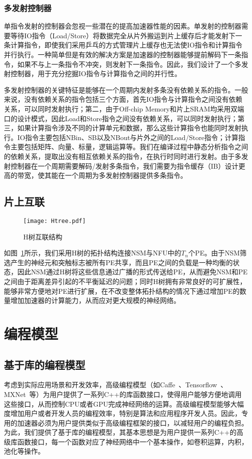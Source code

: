 \subsubsection{多发射控制器}
单指令发射的控制器会忽视一些潜在的提高加速器性能的因素。单发射的控制器需要等待IO指令（Load/Store）将数据完全从片外搬运到片上缓存后才能发射下一条计算指令，即使我们采用乒乓的方式管理片上缓存也无法使IO指令和计算指令并行执行。一种简单但是有效的解决方案是加速器的控制器能够提前解码下一条指令，如果不与上一条指令不冲突，则发射下一条指令。因此，我们设计了一个多发射控制器，用于充分挖掘IO指令与计算指令之间的并行性。

多发射控制器的关键特征是能够在一个周期内发射多条没有依赖关系的指令。一般来说，没有依赖关系的指令包括三个方面，首先IO指令与计算指令之间没有依赖关系，可以同时发射执行；第二，由于Off-chip Memory和片上SRAM均采用双端口的设计模式，因此Load和Store指令之间没有依赖关系，可以同时发射执行；第三，如果计算指令涉及不同的计算单元和数据，那么这些计算指令也能同时发射执行。IO指令主要包括NBin、SB以及NBout与片外之间的Load/Store指令；计算指令主要包括矩阵、向量、标量，逻辑运算等。我们在编译过程中静态分析指令之间的依赖关系，提取出没有相互依赖关系的指令，在执行时同时进行发射。由于多发射控制器在一个周期需要解码/发射多条指令，我们需要为指令缓存（IB）设计更高的带宽，使其能在一个周期为多发射控制器提供多条指令。

\subsection{片上互联}

\begin{figure}[h]
\centering
\texttt{[image: Htree.pdf]}
\caption{H树互联结构}
\label{fig:Htree}
\end{figure}

如图~\ref{fig:Htree}所示，我们采用H树的拓扑结构连接NSM与NFU中的$T_n$个PE。由于NSM筛选产生的神经元和突触标志被所有PE共享，而且PE之间的负载是一种均衡的状态，因此NSM通过H树将这些信息通过广播的形式传送给PE，从而避免NSM和PE之间由于距离差异引起的不平衡延迟的问题；同时H树拥有非常良好的可扩展性，能够非常方便地对PE进行扩展，在不改变整体拓扑结构的情况下通过增加PE的数量增加加速器的计算能力，从而应对更大规模的神经网络。


\section{编程模型}

\subsection{基于库的编程模型}
考虑到实际应用场景和开发效率，高级编程模型（如Caffe~\cite{jia2014caffe}、Tensorflow~\cite{abadi2016tensorflow}、MXNet~\cite{chen2015mxnet}等）为用户提供了一系列C++的库函数接口，使得用户能够方便地调用这些接口，从而控制CPU或者GPU完成神经网络的运算。高级编程模型能够大幅度增加用户或者开发人员的编程效率，特别是算法和应用程序开发人员。因此，专用的加速器必须为用户提供类似于高级编程框架的接口，以减轻用户的编程负担。为此，我们提供了基于库的编程模型，其基本思想是为用户提供一系列C++的高级库函数接口，每一个函数对应了神经网络中一个基本操作，如卷积运算，内积，池化等操作。

